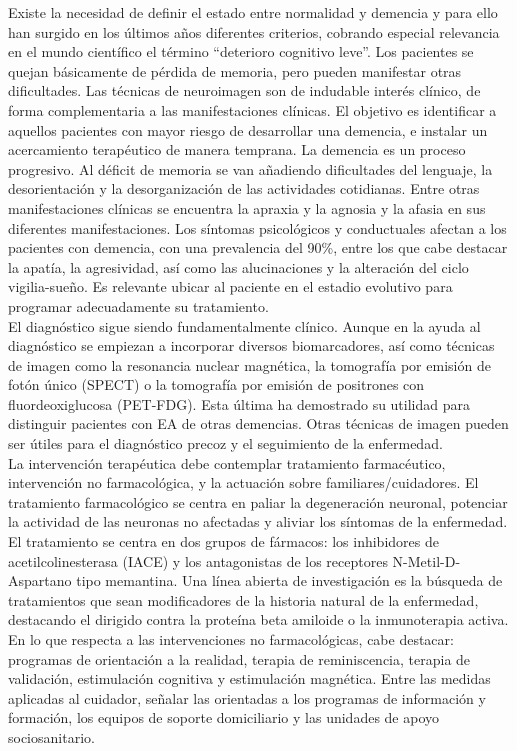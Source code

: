 \documentclass[12pt]{article}
\begin{document}
		Existe la necesidad de definir el estado entre normalidad y demencia y para ello han surgido en los últimos años diferentes criterios, cobrando especial relevancia en el mundo científico el término “deterioro cognitivo leve”. Los pacientes se quejan básicamente de pérdida de memoria, pero pueden manifestar otras dificultades. Las técnicas de neuroimagen son de indudable interés clínico, de forma complementaria a las manifestaciones clínicas. El objetivo es identificar a aquellos pacientes con mayor riesgo de desarrollar una demencia, e instalar un acercamiento terapéutico de manera temprana.
		La demencia es un proceso progresivo. Al déficit de memoria se van añadiendo dificultades del lenguaje, la desorientación y la desorganización de las actividades cotidianas. Entre otras manifestaciones clínicas se encuentra la apraxia y la agnosia y la afasia en sus diferentes manifestaciones. Los síntomas psicológicos y conductuales afectan a los pacientes con demencia, con una prevalencia del 90\%, entre los que cabe destacar la apatía, la agresividad, así como las alucinaciones y la alteración del ciclo vigilia-sueño. Es relevante ubicar al paciente en el estadio evolutivo para programar adecuadamente su tratamiento.\\
		
		El diagnóstico sigue siendo fundamentalmente clínico. Aunque en la ayuda al diagnóstico se empiezan a incorporar diversos biomarcadores, así como técnicas de imagen como la resonancia nuclear magnética, la tomografía por emisión de fotón único (SPECT) o la tomografía por emisión de positrones con fluordeoxiglucosa (PET-FDG). Esta última ha demostrado su utilidad para distinguir pacientes con EA de otras demencias. Otras técnicas de imagen pueden ser útiles para el diagnóstico precoz y el seguimiento de la enfermedad.\\
		
		La intervención terapéutica debe contemplar tratamiento farmacéutico, intervención no farmacológica,  y la actuación sobre familiares/cuidadores. El tratamiento farmacológico se centra en paliar la degeneración neuronal, potenciar la actividad de las neuronas no afectadas y aliviar los síntomas de la enfermedad. El tratamiento se centra en dos grupos de fármacos: los inhibidores de acetilcolinesterasa (IACE) y los antagonistas de los receptores N-Metil-D-Aspartano tipo memantina. Una línea abierta de investigación es la búsqueda de tratamientos que sean modificadores de la historia natural de la enfermedad, destacando el dirigido contra la proteína beta amiloide o la inmunoterapia activa. En lo que respecta a las intervenciones no farmacológicas, cabe destacar: programas de orientación a la realidad, terapia de reminiscencia, terapia de validación, estimulación cognitiva y estimulación magnética. Entre las medidas aplicadas al cuidador, señalar las orientadas a los programas de información y formación, los equipos de soporte domiciliario y las unidades de apoyo sociosanitario.\\
		
\end{document}
